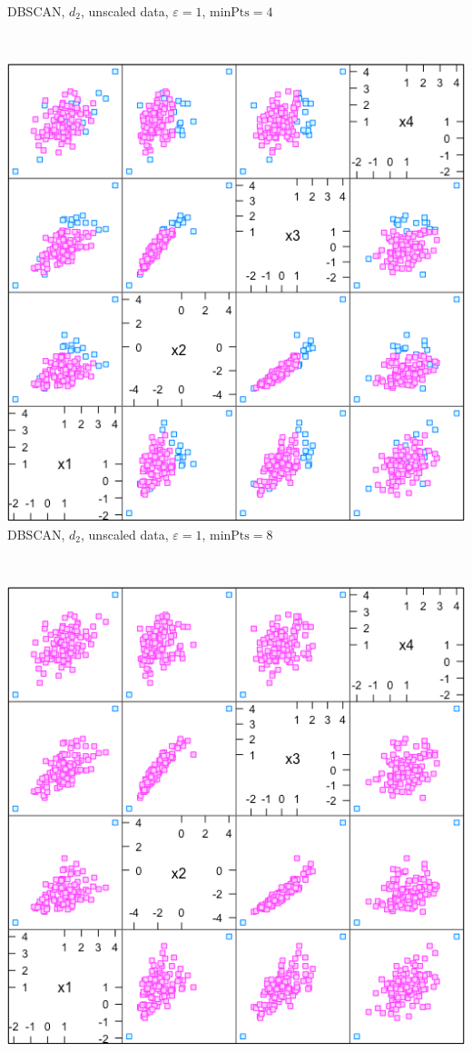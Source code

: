 \documentclass[20pt,landscape,footrule,headrule]{foils}
\begin{document}
{{\begin{center}
DBSCAN, $d_2$, unscaled data, $\varepsilon=1$, $\text{minPts}=4$
\end{center}
\newpage \ 
\begin{center}
\includegraphics[height=0.85\textheight]{Images/db_3} \\ 
DBSCAN, $d_2$, unscaled data, $\varepsilon=1$, $\text{minPts}=8$
\end{center}
\newpage \ 
\begin{center}
\includegraphics[height=0.85\textheight]{Images/db_4} \\ 

\end{center}}}
\end{document}
